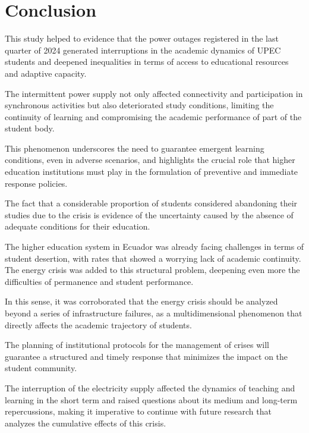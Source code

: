 \documentclass[english]{textolivre}
\begin{document}
\section{Conclusion}\label{sec-modelo}
This study helped to evidence that the power outages registered in the last quarter of 2024 generated interruptions in the academic dynamics of UPEC students and deepened inequalities in terms of access to educational resources and adaptive capacity.

The intermittent power supply not only affected connectivity and participation in synchronous activities but also deteriorated study conditions, limiting the continuity of learning and compromising the academic performance of part of the student body.

This phenomenon underscores the need to guarantee emergent learning conditions, even in adverse scenarios, and highlights the crucial role that higher education institutions must play in the formulation of preventive and immediate response policies.

The fact that a considerable proportion of students considered abandoning their studies due to the crisis is evidence of the uncertainty caused by the absence of adequate conditions for their education.

The higher education system in Ecuador was already facing challenges in terms of student desertion, with rates that showed a worrying lack of academic continuity. The energy crisis was added to this structural problem, deepening even more the difficulties of permanence and student performance.

In this sense, it was corroborated that the energy crisis should be analyzed beyond a series of infrastructure failures, as a multidimensional phenomenon that directly affects the academic trajectory of students.

The planning of institutional protocols for the management of crises will guarantee a structured and timely response that minimizes the impact on the student community.

The interruption of the electricity supply affected the dynamics of teaching and learning in the short term and raised questions about its medium and long-term repercussions, making it imperative to continue with future research that analyzes the cumulative effects of this crisis.

\printbibliography\label{sec-bib}
\end{document}

